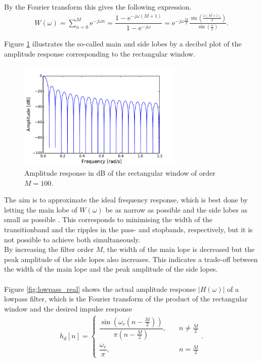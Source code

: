 By the Fourier transform this gives the following expression.
\begin{align*}
W\left(\omega\right) = \sum_{n=0}^{M} \text{e}^{-j\omega n} = \dfrac{1 - \text{e}^{-j\omega(M+1)}}{1 - \text{e}^{-j\omega}} = \text{e}^{-j\omega \frac{M}{2}} \frac{ \sin \left( \frac{\omega \left( M+1 \right)}{2} \right)}{\sin \left( \frac{\omega}{2} \right)}.
\end{align*}

Figure \ref{fig:rect_db} illustrates the so-called main and side lobes by a decibel plot of the amplitude response corresponding to the rectangular window.

\begin{figure}[H]
\centering
\includegraphics[width=0.7\textwidth]{figures/dbplots/rect.pdf}
\caption{Amplitude response in dB of the rectangular window of order $M=100$.}
\label{fig:rect_db}
\end{figure}

%
The aim is to approximate the ideal frequency response, which is best done by letting the main lobe of $W(\omega)$ be as narrow as possible and the side lobes as small as possible \cite{page 558, DTSP}. This corresponds to minimising the width of the transitionband and the ripples in the pass- and stopbands, respectively, but it is not possible to achieve both simultaneously. \\
By increasing the filter order $M$, the width of the main lope is decreased but the peak amplitude of the side lopes also increases. This indicates a trade-off between the width of the main lope and the peak amplitude of the side lopes.
\\ \\
Figure \ref{fig:lowpass_real} shows the actual amplitude response $|H(\omega)|$ of a lowpass filter, which is the Fourier transform of the product of the rectangular window and the desired impulse response
\begin{align*}
h_d[n] =
\begin{cases}
\dfrac{\sin\left(\omega_c\left(n - \frac{M}{2}\right)\right)}{\pi\left(n-\frac{M}{2}\right)}, \quad &n \neq \frac{M}{2} \\
\dfrac{\omega_c}{\pi}, \quad &n = \frac{M}{2}
\end{cases}.
\end{align*}

